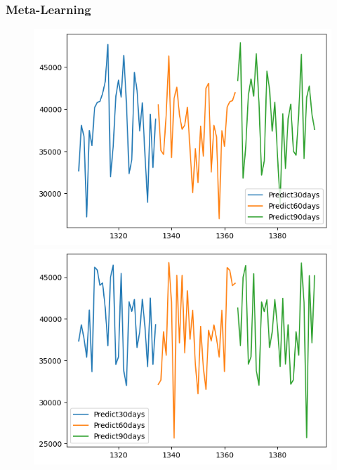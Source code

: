 \subsubsection{Meta-Learning}
\begin{figure}[H]
    \centering
    \begin{minipage}{0.15\textwidth}
    \centering
    \includegraphics[width=1\textwidth]{resources/chapter-5/newdata1/predicted/BIDV_ML_7_3_30days.png}
    \end{minipage}
    \hfill
    \begin{minipage}{0.15\textwidth}
    \centering
    \includegraphics[width=1\textwidth]{resources/chapter-5/newdata1/predicted/BIDV_ML_8_2_30days.png}
    \end{minipage}
    \hfill

\end{figure}

